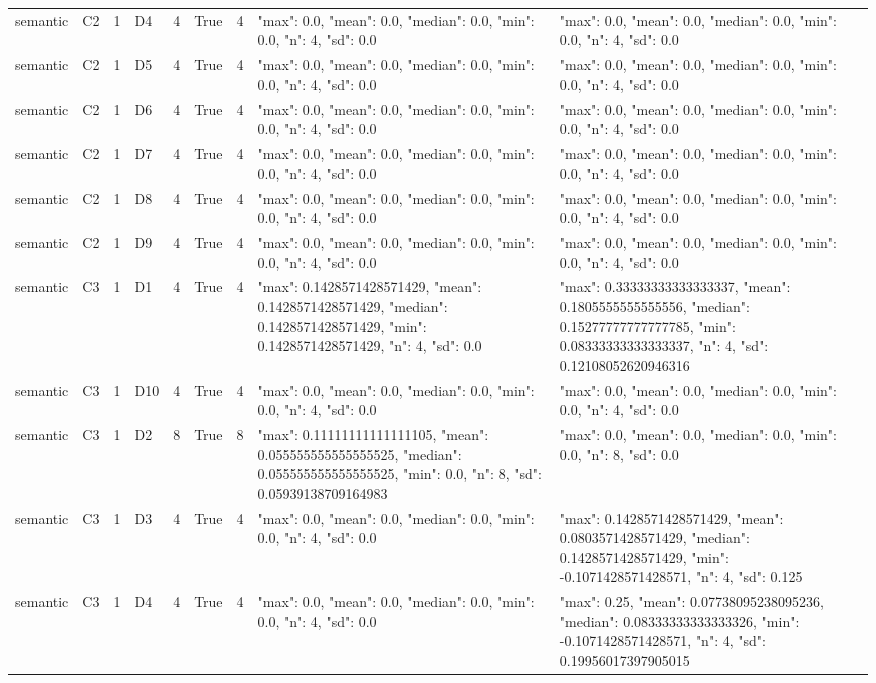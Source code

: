 \begin{tabular}{lllllllll}
semantic & C2 & 1 & D4 & 4 & True & 4 & {"max": 0.0, "mean": 0.0, "median": 0.0, "min": 0.0, "n": 4, "sd": 0.0} & {"max": 0.0, "mean": 0.0, "median": 0.0, "min": 0.0, "n": 4, "sd": 0.0} \\
semantic & C2 & 1 & D5 & 4 & True & 4 & {"max": 0.0, "mean": 0.0, "median": 0.0, "min": 0.0, "n": 4, "sd": 0.0} & {"max": 0.0, "mean": 0.0, "median": 0.0, "min": 0.0, "n": 4, "sd": 0.0} \\
semantic & C2 & 1 & D6 & 4 & True & 4 & {"max": 0.0, "mean": 0.0, "median": 0.0, "min": 0.0, "n": 4, "sd": 0.0} & {"max": 0.0, "mean": 0.0, "median": 0.0, "min": 0.0, "n": 4, "sd": 0.0} \\
semantic & C2 & 1 & D7 & 4 & True & 4 & {"max": 0.0, "mean": 0.0, "median": 0.0, "min": 0.0, "n": 4, "sd": 0.0} & {"max": 0.0, "mean": 0.0, "median": 0.0, "min": 0.0, "n": 4, "sd": 0.0} \\
semantic & C2 & 1 & D8 & 4 & True & 4 & {"max": 0.0, "mean": 0.0, "median": 0.0, "min": 0.0, "n": 4, "sd": 0.0} & {"max": 0.0, "mean": 0.0, "median": 0.0, "min": 0.0, "n": 4, "sd": 0.0} \\
semantic & C2 & 1 & D9 & 4 & True & 4 & {"max": 0.0, "mean": 0.0, "median": 0.0, "min": 0.0, "n": 4, "sd": 0.0} & {"max": 0.0, "mean": 0.0, "median": 0.0, "min": 0.0, "n": 4, "sd": 0.0} \\
semantic & C3 & 1 & D1 & 4 & True & 4 & {"max": 0.1428571428571429, "mean": 0.1428571428571429, "median": 0.1428571428571429, "min": 0.1428571428571429, "n": 4, "sd": 0.0} & {"max": 0.33333333333333337, "mean": 0.1805555555555556, "median": 0.15277777777777785, "min": 0.08333333333333337, "n": 4, "sd": 0.12108052620946316} \\
semantic & C3 & 1 & D10 & 4 & True & 4 & {"max": 0.0, "mean": 0.0, "median": 0.0, "min": 0.0, "n": 4, "sd": 0.0} & {"max": 0.0, "mean": 0.0, "median": 0.0, "min": 0.0, "n": 4, "sd": 0.0} \\
semantic & C3 & 1 & D2 & 8 & True & 8 & {"max": 0.11111111111111105, "mean": 0.055555555555555525, "median": 0.055555555555555525, "min": 0.0, "n": 8, "sd": 0.05939138709164983} & {"max": 0.0, "mean": 0.0, "median": 0.0, "min": 0.0, "n": 8, "sd": 0.0} \\
semantic & C3 & 1 & D3 & 4 & True & 4 & {"max": 0.0, "mean": 0.0, "median": 0.0, "min": 0.0, "n": 4, "sd": 0.0} & {"max": 0.1428571428571429, "mean": 0.0803571428571429, "median": 0.1428571428571429, "min": -0.1071428571428571, "n": 4, "sd": 0.125} \\
semantic & C3 & 1 & D4 & 4 & True & 4 & {"max": 0.0, "mean": 0.0, "median": 0.0, "min": 0.0, "n": 4, "sd": 0.0} & {"max": 0.25, "mean": 0.07738095238095236, "median": 0.08333333333333326, "min": -0.1071428571428571, "n": 4, "sd": 0.19956017397905015} \\

\end{tabular}
